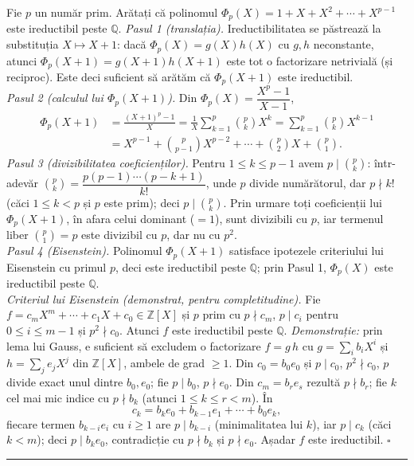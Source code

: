 Fie $p$ un număr prim. Arătați că polinomul $\Phi_p(X)=1+X+X^2+\cdots+X^{p-1}$ este ireductibil peste $\mathbb{Q}$.
\sol \emph{Pasul 1 (translația).} Ireductibilitatea se păstrează la substituția $X\mapsto X+1$: dacă $\Phi_p(X)=g(X)h(X)$ cu $g,h$ neconstante, atunci $\Phi_p(X+1)=g(X+1)h(X+1)$ este tot o factorizare netrivială (și reciproc). Este deci suficient să arătăm că $\Phi_p(X+1)$ este ireductibil.\\[2pt]
\emph{Pasul 2 (calculul lui $\Phi_p(X+1)$).} Din $\Phi_p(X)=\dfrac{X^p-1}{X-1}$,
\[ \begin{aligned} \Phi_p(X+1)&=\frac{(X+1)^p-1}{X}=\frac1X\sum_{k=1}^{p}\binom{p}{k}X^k=\sum_{k=1}^{p}\binom{p}{k}X^{k-1}\\ &=X^{p-1}+\binom{p}{p-1}X^{p-2}+\cdots+\binom{p}{2}X+\binom{p}{1}. \end{aligned} \]
\emph{Pasul 3 (divizibilitatea coeficienților).} Pentru $1\le k\le p-1$ avem $p\mid\binom{p}{k}$: într-adevăr $\binom{p}{k}=\dfrac{p(p-1)\cdots(p-k+1)}{k!}$, unde $p$ divide numărătorul, dar $p\nmid k!$ (căci $1\le k<p$ și $p$ este prim); deci $p\mid\binom{p}{k}$. Prin urmare toți coeficienții lui $\Phi_p(X+1)$, în afara celui dominant ($=1$), sunt divizibili cu $p$, iar termenul liber $\binom{p}{1}=p$ este divizibil cu $p$, dar nu cu $p^2$.\\[2pt]
\emph{Pasul 4 (Eisenstein).} Polinomul $\Phi_p(X+1)$ satisface ipotezele criteriului lui Eisenstein cu primul $p$, deci este ireductibil peste $\mathbb{Q}$; prin Pasul 1, $\Phi_p(X)$ este ireductibil peste $\mathbb{Q}$.\\[3pt]
\emph{Criteriul lui Eisenstein (demonstrat, pentru completitudine).} Fie $f=c_mX^m+\cdots+c_1X+c_0\in\mathbb{Z}[X]$ și $p$ prim cu $p\nmid c_m$, $p\mid c_i$ pentru $0\le i\le m-1$ și $p^2\nmid c_0$. Atunci $f$ este ireductibil peste $\mathbb{Q}$. \emph{Demonstrație:} prin lema lui Gauss, e suficient să excludem o factorizare $f=g\,h$ cu $g=\sum_i b_iX^i$ și $h=\sum_j e_jX^j$ din $\mathbb{Z}[X]$, ambele de grad $\ge1$. Din $c_0=b_0e_0$ și $p\mid c_0$, $p^2\nmid c_0$, $p$ divide exact unul dintre $b_0,e_0$; fie $p\mid b_0$, $p\nmid e_0$. Din $c_m=b_re_s$ rezultă $p\nmid b_r$; fie $k$ cel mai mic indice cu $p\nmid b_k$ (atunci $1\le k\le r<m$). În
\[ c_k=b_ke_0+b_{k-1}e_1+\cdots+b_0e_k, \]
fiecare termen $b_{k-i}e_i$ cu $i\ge1$ are $p\mid b_{k-i}$ (minimalitatea lui $k$), iar $p\mid c_k$ (căci $k<m$); deci $p\mid b_ke_0$, contradicție cu $p\nmid b_k$ și $p\nmid e_0$. Așadar $f$ este ireductibil. $\square$
\vspace{1mm}\hrule

